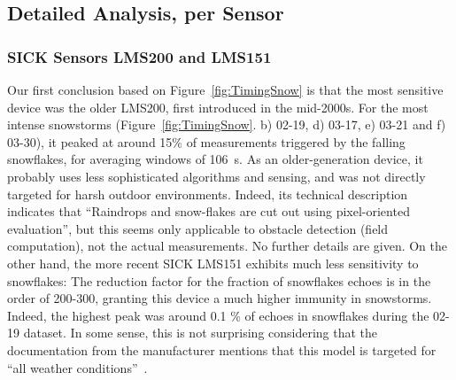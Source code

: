\subsection{Detailed Analysis, per Sensor}

\subsubsection{SICK Sensors LMS200 and LMS151}
Our first conclusion based on Figure~\ref{fig:TimingSnow} is that the most sensitive device was the older LMS200, first introduced in the mid-2000s. For the most intense snowstorms (Figure~\ref{fig:TimingSnow}. b) 02-19, d) 03-17, e) 03-21 and f) 03-30), it peaked at around 15\% of measurements triggered by the falling snowflakes, for averaging windows of \SI{106}{\second}. As an older-generation device, it probably uses less sophisticated algorithms and sensing, and was not directly targeted for harsh outdoor environments. Indeed, its technical description~\citep{LMS200Manual} indicates that ``Raindrops and snow-flakes are cut out using pixel-oriented evaluation'', but this seems only applicable to obstacle detection (field computation), not the actual measurements. No further details are given. On the other hand, the more recent SICK LMS151 exhibits much less sensitivity to snowflakes: The reduction factor for the fraction of snowflakes echoes is in the order of 200-300, granting this device a much higher immunity in snowstorms. Indeed, the highest peak was around 0.1 \% of echoes in snowflakes during the 02-19 dataset. In some sense, this is not surprising considering that the documentation from the manufacturer mentions that this model is targeted for ``all weather conditions''~\citep{LMS151Manual}.


